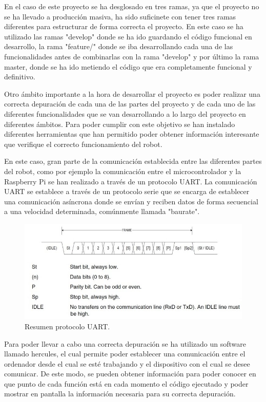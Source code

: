 En el caso de este proyecto se ha desglosado en tres ramas, ya que el proyecto no se ha llevado a producción masiva, ha sido suficinete con tener tres ramas diferentes para estructurar de forma correcta el proyecto. En este caso se ha utilizado las ramas "develop" donde se ha ido guardando el código funcional en desarrollo, la rama "feature/" donde se iba desarrollando cada una de las funcionalidades antes de combinarlas con la rama "develop" y por último la rama master, donde se ha ido metiendo el código que era completamente funcional y definitivo.

Otro ámbito importante a la hora de desarrollar el proyecto es poder realizar una correcta depuración de cada una de las partes del proyecto y de cada uno de las diferentes funcionalidades que se van desarrollando a lo largo del proyecto en diferentes ámbitos. Para poder cumplir con este objetivo se han instalado diferentes herramientas que han permitido poder obtener información interesante que verifique el correcto funcionamiento del robot.

En este caso, gran parte de la comunicación establecida entre las diferentes partes del robot, como por ejemplo la comunicación entre el microcontrolador y la Raspberry Pi se han realizado a través de un protocolo UART. La comunicación UART se establece a través de un protocolo serie que se encarga de establecer una comunicación asíncrona donde se envían y reciben datos de forma secuencial a una velocidad determinada, comúnmente llamada "baurate".

\begin{figure}[h]
    \centering
    \includegraphics[scale=0.5]{fig/uart.jpg}
    \caption{Resumen protocolo UART.}
    \label{fig:mesh1}
\end{figure}

Para poder llevar a cabo una correcta depuración se ha utilizado un software llamado hercules, el cual permite poder establecer una comunicación entre el ordenador desde el cual se esté trabajando y el dispositivo con el cual se desee comunicar. De este modo, se pueden obtener información para poder conocer en que punto de cada función está en cada momento el código ejecutado y poder mostrar en pantalla la información necesaria para su correcta depuración.

